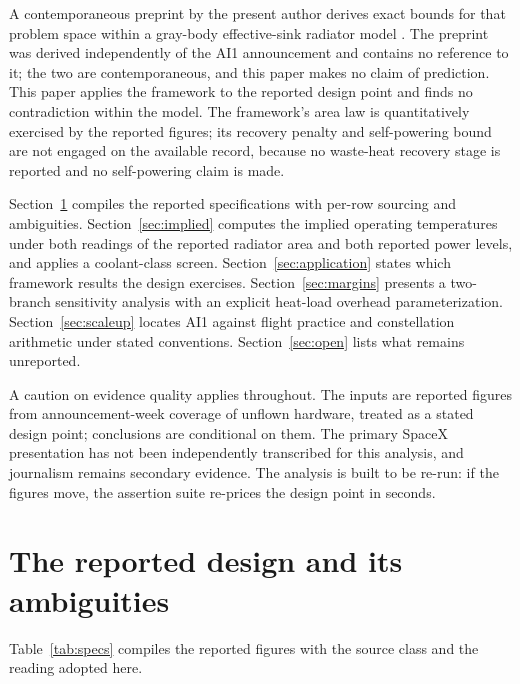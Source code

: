 \documentclass[11pt]{article}
\begin{document}
A contemporaneous preprint by the present author derives exact bounds for that problem space within a gray-body effective-sink radiator model \cite{leeodinson2026}. The preprint was derived independently of the AI1 announcement and contains no reference to it; the two are contemporaneous, and this paper makes no claim of prediction. This paper applies the framework to the reported design point and finds no contradiction within the model. The framework's area law is quantitatively exercised by the reported figures; its recovery penalty and self-powering bound are not engaged on the available record, because no waste-heat recovery stage is reported and no self-powering claim is made.

Section~\ref{sec:reported} compiles the reported specifications with per-row sourcing and ambiguities. Section~\ref{sec:implied} computes the implied operating temperatures under both readings of the reported radiator area and both reported power levels, and applies a coolant-class screen. Section~\ref{sec:application} states which framework results the design exercises. Section~\ref{sec:margins} presents a two-branch sensitivity analysis with an explicit heat-load overhead parameterization. Section~\ref{sec:scaleup} locates AI1 against flight practice and constellation arithmetic under stated conventions. Section~\ref{sec:open} lists what remains unreported.

A caution on evidence quality applies throughout. The inputs are reported figures from announcement-week coverage of unflown hardware, treated as a stated design point; conclusions are conditional on them. The primary SpaceX presentation has not been independently transcribed for this analysis, and journalism remains secondary evidence. The analysis is built to be re-run: if the figures move, the assertion suite re-prices the design point in seconds.

\section{The reported design and its ambiguities}\label{sec:reported}

Table~\ref{tab:specs} compiles the reported figures with the source class and the reading adopted here.
\end{document}
